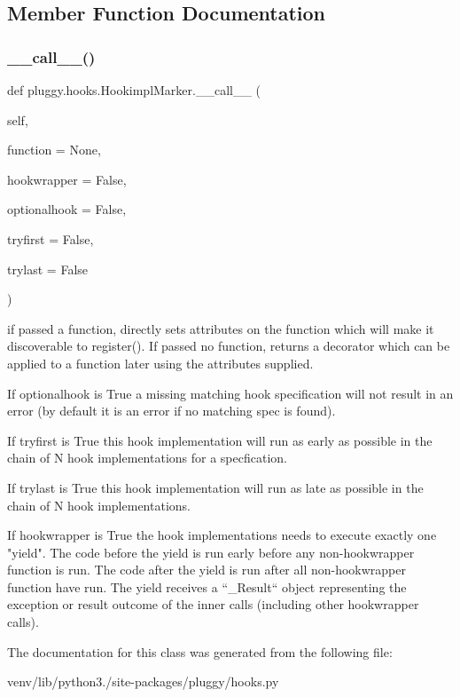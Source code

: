 \subsection{Member Function Documentation}
\mbox{\label{classpluggy_1_1hooks_1_1_hookimpl_marker_a1ea05e056abe8433e2762497b0b7a629}} 
\subsubsection{\texorpdfstring{\+\_\+\+\_\+call\+\_\+\+\_\+()}{\_\_call\_\_()}}
{\footnotesize\ttfamily def pluggy.\+hooks.\+Hookimpl\+Marker.\+\_\+\+\_\+call\+\_\+\+\_\+ (\begin{DoxyParamCaption}\item[{}]{self,  }\item[{}]{function = {\ttfamily None},  }\item[{}]{hookwrapper = {\ttfamily False},  }\item[{}]{optionalhook = {\ttfamily False},  }\item[{}]{tryfirst = {\ttfamily False},  }\item[{}]{trylast = {\ttfamily False} }\end{DoxyParamCaption})}

\begin{DoxyVerb}if passed a function, directly sets attributes on the function
which will make it discoverable to register().  If passed no function,
returns a decorator which can be applied to a function later using
the attributes supplied.

If optionalhook is True a missing matching hook specification will not result
in an error (by default it is an error if no matching spec is found).

If tryfirst is True this hook implementation will run as early as possible
in the chain of N hook implementations for a specfication.

If trylast is True this hook implementation will run as late as possible
in the chain of N hook implementations.

If hookwrapper is True the hook implementations needs to execute exactly
one "yield".  The code before the yield is run early before any non-hookwrapper
function is run.  The code after the yield is run after all non-hookwrapper
function have run.  The yield receives a ``_Result`` object representing
the exception or result outcome of the inner calls (including other hookwrapper
calls).\end{DoxyVerb}
 

The documentation for this class was generated from the following file\+:\begin{DoxyCompactItemize}
\item 
venv/lib/python3./site-\/packages/pluggy/hooks.\+py\end{DoxyCompactItemize}
